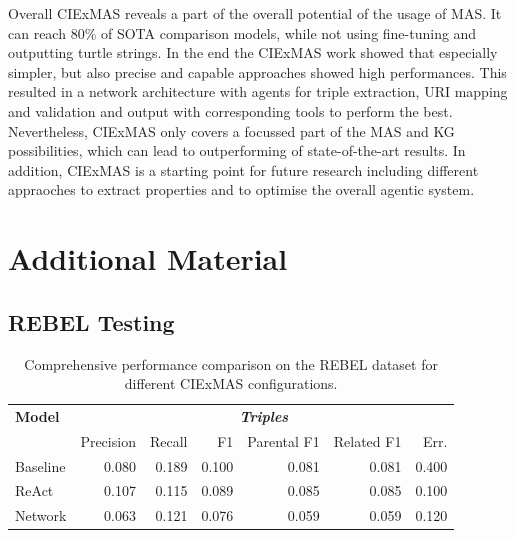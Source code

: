 \documentclass[a4paper,oneside,bibliography=totoc]{scrbook}
\begin{document}
Overall CIExMAS reveals a part of the overall potential of the usage of \ac{MAS}. It can reach 80\% of SOTA comparison models, while not using fine-tuning and outputting turtle strings. In the end the CIExMAS work showed that especially simpler, but also precise and capable approaches showed high performances. This resulted in a network architecture with agents for triple extraction, URI mapping and validation and output with corresponding tools to perform the best. Nevertheless, CIExMAS only covers a focussed part of the \ac{MAS} and \ac{KG} possibilities, which can lead to outperforming of state-of-the-art results. In addition, CIExMAS is a starting point for future research including different appraoches to extract properties and to optimise the overall agentic system.



\appendix
\chapter{Additional Material}
\label{ch:additional_material}

\section{REBEL Testing}
\label{sec:rebel_testing}

\begin{table}[h]
  \centering
  \begin{tabular}{l|rrrrrr}
    \toprule
    \textbf{Model} & \multicolumn{6}{c}{\textit{\textbf{Triples}}}                                                     \\
                   & Precision                                     & Recall & F1    & Parental F1 & Related F1 & Err.  \\
    \midrule
    Baseline       & 0.080                                         & 0.189  & 0.100 & 0.081       & 0.081      & 0.400 \\
    ReAct          & 0.107                                         & 0.115  & 0.089 & 0.085       & 0.085      & 0.100 \\
    Network        & 0.063                                         & 0.121  & 0.076 & 0.059       & 0.059      & 0.120 \\
    \bottomrule
  \end{tabular}
  \caption{Comprehensive performance comparison on the REBEL dataset for different CIExMAS configurations.}
  \label{tab:rebel_comprehensive_results}
\end{table}
\end{document}
